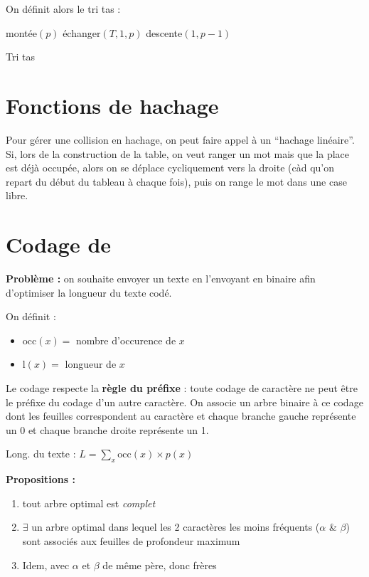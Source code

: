\documentclass[a4paper, 8pt]{article}
\begin{document}
\begin{multicols*}{3}
On définit alors le tri tas :

\begin{algorithm}[H]
  {
  	montée$(p)$ \;
  }
  {
  	échanger$(T,1,p)$ \;
  	descente$(1,p-1)$ \;
  }
 \caption{Tri tas}
\end{algorithm}

\section*{Fonctions de hachage}

Pour gérer une collision en hachage, on peut faire appel à un  \enquote{hachage linéaire}. Si, lors de la construction de la table, on veut ranger un mot mais que la place est déjà occupée, alors on se déplace cycliquement vers la droite (càd qu'on repart du début du tableau à chaque fois), puis on range le mot dans une case libre.

\section*{Codage de }

\textbf{Problème :} on souhaite envoyer un texte en l'envoyant en binaire afin d'optimiser la longueur du texte codé.

\newcommand{\occ}{\text{occ}}
\newcommand{\lng}{\text{l}}
On définit :
\begin{itemize}
\item $\occ(x) =$ nombre d'occurence de $x$
\item $\lng(x) =$ longueur de $x$
\end{itemize}

Le codage respecte la \textbf{règle du préfixe} : toute codage de caractère ne peut être le préfixe du codage d'un autre caractère. On associe un arbre binaire à ce codage dont les feuilles correspondent au caractère et chaque branche gauche représente un 0 et chaque branche droite représente un 1.

Long. du texte :
$L = \sum_{x}{\occ(x)\times p(x)}$

\textbf{Propositions :}
\begin{enumerate}
\item tout arbre optimal est \emph{complet}
\item $\exists$ un arbre optimal dans lequel les 2 caractères les moins fréquents ($\alpha$ \& $\beta$) sont associés aux feuilles de profondeur maximum
\item Idem, avec $\alpha$ et $\beta$ de même père, donc frères
\end{enumerate}


\end{multicols*}
\end{document}
